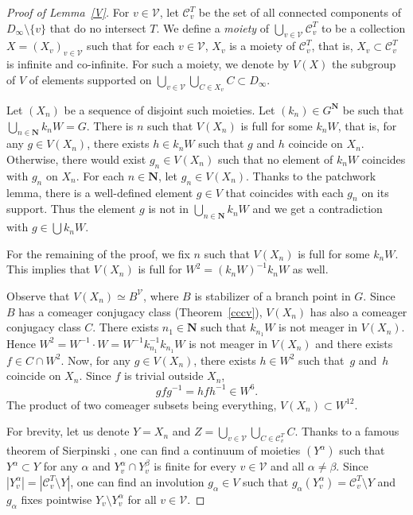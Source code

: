 \documentclass[JEP,XML,SOM,Unicode,NoFloatCountersInSection]{cedram}
\let\mathcal\mathscr
\theoremstyle{plain}
\theoremstyle{definition}
\newcommand{\NN}{\mathbf{N}}
\newcommand{\cC}{\mathcal{C}}
\newcommand{\cV}{\mathcal{V}}
\begin{document}
\begin{proof}[Proof of Lemma~\ref{V}] For $v\in\cV$, let $\cC_v^T$ be the set of all connected components of $D_\infty\setminus\{v\}$ that do no intersect $T$. We define a \emph{moiety} of $\bigcup_{v\in\cV}\cC_v^T$ to be a collection $X=(X_v)_{v\in \cV}$ such that for each $v\in\cV$, $X_v$ is a moiety of $\cC_v^T$, that is, $X_v\subset \cC_v^T$ is infinite and co-infinite.
For such a moiety, we denote by $V(X)$ the subgroup of $V$ of elements supported on $\bigcup_{v\in \cV}\bigcup_{C\in X_v}C\subset D_\infty$.

Let $(X_n)$ be a sequence of disjoint such moieties. Let $(k_n)\in G^\NN$ be such that $\bigcup_{n\in\NN}k_nW=G$. There is $n$ such that $V(X_n)$ is full for some $k_nW$, that is, for any $g\in V(X_n)$, there exists $h\in k_nW$ such that $g$ and $h$ coincide on $X_n$. Otherwise, there would exist $g_n\in V(X_n)$ such that no element of $k_nW$ coincides with $g_n$ on $X_n$. For each $n\in\NN$, let $g_n\in V(X_n)$. Thanks to the patchwork lemma, there is a well-defined element $g\in V$ that coincides with each $g_n$ on its support. Thus the element $g$ is not in $\bigcup_{n\in\NN}k_nW$ and we get a contradiction with $g\in\bigcup k_nW$.

For the remaining of the proof, we fix $n$ such that $V(X_n)$ is full for some $k_nW$. This implies that $V(X_n)$ is full for $W^2=(k_nW)^{-1}k_nW$ as well.

Observe that $V(X_n)\simeq B^\cV$, where $B$ is stabilizer of a branch point in $G$. Since $B$ has a comeager conjugacy class (Theorem~\ref{cccv}), $V(X_n)$ has also a comeager conjugacy class $C$. There exists $n_1\in \NN$ such that $k_{n_1}W$ is not meager in $V(X_n)$. Hence $W^2=W^{-1}\cdot W=W^{-1}k_{n_1}^{-1}k_{n_1}W$ is not meager in $V(X_n)$ and there exists $f\in C\cap W^2$. Now, for any $g\in V(X_n)$, there exists $h\in W^2$ such that~$g$ and~$h$ coincide on $X_n$. Since $f$ is trivial outside $X_n$,
\[
gfg^{-1}=hfh^{-1}\in W^6.
\]
The product of two comeager subsets being everything, $V(X_n)\subset W^{12}$.

For brevity, let us denote $Y=X_n$ and $Z=\bigcup_{v\in\cV}\bigcup_{C\in\cC_v^T}C$. Thanks to a famous theorem of Sierpinski \cite{MR1549531}, one can find a continuum of moieties $(Y^\alpha)$ such that $Y^\alpha\subset Y$ for any $\alpha$ and $Y_v^\alpha\cap Y_v^\beta$ is finite for every $v\in\cV$ and all $\alpha\neq\beta$. Since $|Y_v^\alpha|=|\cC_v^T\setminus Y|$, one can find an involution $g_\alpha\in V$ such that $g_\alpha(Y_v^\alpha)=\cC_v^T\setminus Y$ and~$g_\alpha$ fixes pointwise $Y_v\setminus Y_v^\alpha$ for all $v\in\cV$.


\end{proof}
\end{document}
